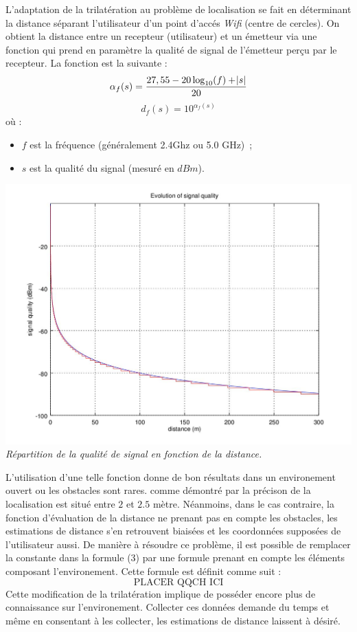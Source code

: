 \documentclass[11pt,journal,compsoc]{IEEEtran}
\begin{document}
      L'adaptation de la trilatération au problème de localisation se fait en déterminant la distance séparant l'utilisateur d'un point d'accés \textit{Wifi} (centre de cercles). On obtient la distance entre un recepteur (utilisateur) et un émetteur via une fonction qui prend en paramètre la qualité de signal de l'émetteur perçu par le recepteur. La fonction est la suivante :
      \begin{equation}
        \alpha_f(s) = \frac{27,55-20\log_{10}(f)+\abs s}{20}
      \end{equation}
      \begin{equation}
        d_f(s) = 10^{\alpha_f(s)}
      \end{equation}
      où :
      \begin{itemize}
        \item $f$ est la fréquence (généralement 2.4Ghz ou 5.0 GHz)~;
        \item $s$ est la qualité du signal (mesuré en $dBm$).
      \end{itemize}
      \begin{center}
        \includegraphics[scale=0.4]{images/signal-propagation.jpg}
        \textit{Répartition de la qualité de signal en fonction de la distance.}
      \end{center}
      L'utilisation d'une telle fonction donne de bon résultats dans un environement ouvert ou les obstacles sont rares. comme démontré par \cite{Roumanie} la précison de la localisation est situé entre $2$ et $2.5$ mètre. Néanmoins, dans le cas contraire, la fonction d'évaluation de la distance ne prenant pas en compte les obstacles, les estimations de distance s'en retrouvent biaisées et les coordonnées supposées de l'utilisateur aussi. De manière à résoudre ce problème, il est possible de remplacer la constante dans la formule (3) par une formule prenant en compte les éléments composant l'environement. Cette formule est définit comme suit :
      \begin{equation}
        \text{PLACER QQCH ICI}
      \end{equation}
      Cette modification de la trilatération implique de posséder encore plus de connaissance sur l'environement. Collecter ces données demande du temps et même en consentant à les collecter, les estimations de distance laissent à désiré.
\end{document}
